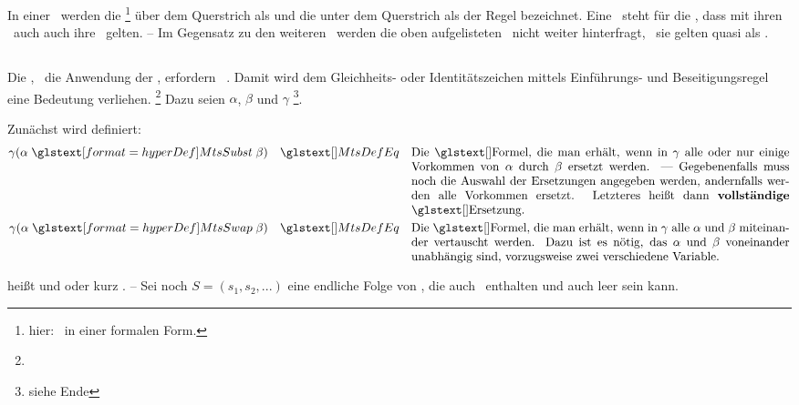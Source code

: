 {In einer \Schlussregel\ werden die \Formeln%
\footnote{hier: \Aussagen\ in einer formalen Form.}
über dem Querstrich als  und die unter dem Querstrich als  der Regel bezeichnet.
Eine \Schlussregel\ steht für die \Aussage, dass mit ihren \Praemissen\ auch auch ihre \Konklusionen\ gelten.
-- Im Gegensatz zu den weiteren \Schlussregeln\ werden die oben aufgelisteten \Basisregeln\ nicht weiter hinterfragt, \textdh\ sie gelten quasi als \Axiome.

\subsection[Identitätsregeln]{\Identitaetsregeln}%
\label                    {sub-Identitaetsregeln}

Die \zulaessigenTransformationen, \textdh\ die Anwendung der \Schlussregeln, erfordern \zulaessige\ \Ersetzungen.
Damit wird dem Gleichheits- oder Identitätszeichen \chrqt{\MtsEq} mittels Einführungs- und Beseitigungsregel eine Bedeutung verliehen.%
\footnote{}
Dazu seien $\alpha$, $\beta$ und $\gamma$ \vergleichbare\footnote{siehe Ende }\Formeln.

Zunächst wird definiert:
\begin{align}
	\gamma(\alpha \defSymBin{\MtsSubst} \beta) \quad \MtsDefEq \quad
	\parbox[t]{11cm}{%
		Die \Formel, die man erhält, wenn in $\gamma$ alle oder nur einige Vorkommen von $\alpha$ durch $\beta$ ersetzt werden.
		--- Gegebenenfalls muss noch die Auswahl der Ersetzungen angegeben werden, andernfalls werden alle Vorkommen ersetzt.
		Letzteres heißt dann \defFt{vollständige} \Ersetzung.
	} \label{def-ErsetzungAlt}\\
	\gamma(\alpha \defSymBin{\MtsSwap} \beta) \quad \MtsDefEq \quad
	\parbox[t]{11cm}{%
		Die \Formel, die man erhält, wenn in $\gamma$ alle $\alpha$ und $\beta$ miteinander vertauscht werden.
		Dazu ist es nötig, das $\alpha$ und $\beta$ voneinander unabhängig sind, vorzugsweise zwei verschiedene Variable.
	} \label{def-Vertauschung}
\end{align}

\seqqt{$ \alpha \MtsSubst \beta $} heißt  und \seqqt{$ \alpha \MtsSwap \beta $}  oder kurz .
-- Sei noch $S = (s_1, s_2, ...)$ eine endliche Folge von \Ersetzungen, die auch \Vertauschungen\ enthalten und auch leer sein kann.

}
